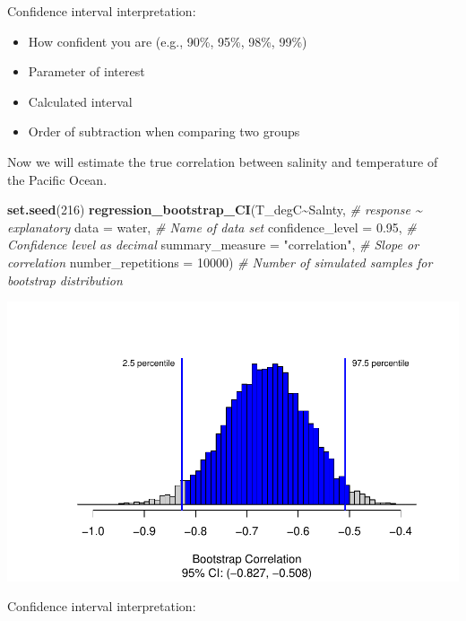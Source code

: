 \documentclass[
]{report}
\newenvironment{Shaded}{\begin{snugshade}}{\end{snugshade}}
\newcommand{\AttributeTok}[1]{\textcolor[rgb]{0.13,0.29,0.53}{#1}}
\newcommand{\CommentTok}[1]{\textcolor[rgb]{0.56,0.35,0.01}{\textit{#1}}}
\newcommand{\DecValTok}[1]{\textcolor[rgb]{0.00,0.00,0.81}{#1}}
\newcommand{\FloatTok}[1]{\textcolor[rgb]{0.00,0.00,0.81}{#1}}
\newcommand{\FunctionTok}[1]{\textcolor[rgb]{0.13,0.29,0.53}{\textbf{#1}}}
\newcommand{\NormalTok}[1]{#1}
\newcommand{\SpecialCharTok}[1]{\textcolor[rgb]{0.81,0.36,0.00}{\textbf{#1}}}
\newcommand{\StringTok}[1]{\textcolor[rgb]{0.31,0.60,0.02}{#1}}
\begin{document}
Confidence interval interpretation:

\begin{itemize}
\item
  How confident you are (e.g., 90\%, 95\%, 98\%, 99\%)
\item
  Parameter of interest
\item
  Calculated interval
\item
  Order of subtraction when comparing two groups
\end{itemize}

\vspace{0.8in}

Now we will estimate the true correlation between salinity and temperature of the Pacific Ocean.

\begin{Shaded}
\begin{Highlighting}[]
\FunctionTok{set.seed}\NormalTok{(}\DecValTok{216}\NormalTok{)}
\FunctionTok{regression\_bootstrap\_CI}\NormalTok{(T\_degC}\SpecialCharTok{\textasciitilde{}}\NormalTok{Salnty, }\CommentTok{\# response \textasciitilde{} explanatory}
   \AttributeTok{data =}\NormalTok{ water, }\CommentTok{\# Name of data set}
   \AttributeTok{confidence\_level =} \FloatTok{0.95}\NormalTok{, }\CommentTok{\# Confidence level as decimal}
   \AttributeTok{summary\_measure =} \StringTok{"correlation"}\NormalTok{, }\CommentTok{\# Slope or correlation}
   \AttributeTok{number\_repetitions =} \DecValTok{10000}\NormalTok{) }\CommentTok{\# Number of simulated samples for bootstrap distribution}
\end{Highlighting}
\end{Shaded}

\begin{center}\includegraphics[width=0.7\linewidth]{13-VN13-regression_files/figure-latex/unnamed-chunk-16-1} \end{center}

Confidence interval interpretation:
\end{document}
